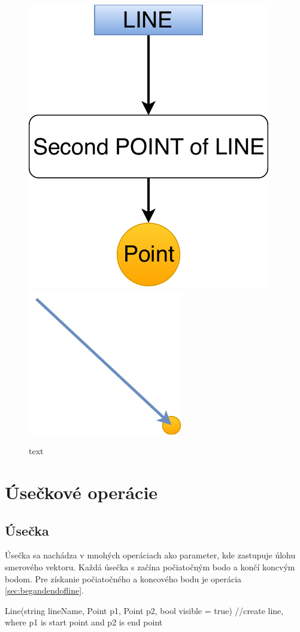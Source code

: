 \begin{figure}[H]
	\centering
	\includegraphics[height=0.3\textwidth]{obrazky-figures/Diagram/DP Navrh operacii-0D - PointSecond POINT of LINE.pdf}
	\includegraphics[height=0.3\textwidth]{obrazky-figures/Diagram/Draw/1Points/DP Navrh operacii-0D - PointSecondPointOfLine.pdf}
	\caption{text}
	\label{fig:1}
\end{figure}



	






\section{Úsečkové operácie}


\subsection{Úsečka}
Úsečka sa nachádza v mnohých operáciach ako parameter, kde zastupuje úlohu smerového vektoru. Každá úsečka s začína počiatočným bodo a končí koncvým bodom. Pre získanie počiatočného a koncového bodu je operácia \ref{sec:begandendofline}.

		Line(string lineName, Point p1, Point p2, bool visible = true) //create line, where p1 is start point and p2 is end point

